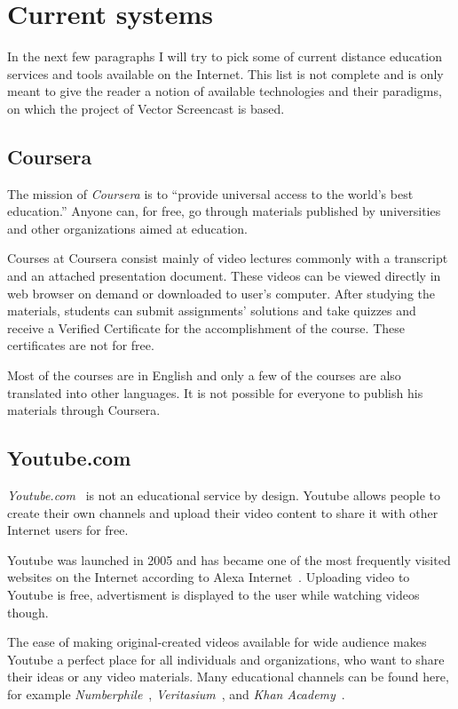 \section{Current systems}
In the next few paragraphs I will try to pick some of current distance education services and tools available on the Internet. This list is not complete and is only meant to give the reader a notion of available technologies and their paradigms, on which the project of Vector Screencast is based.

\subsection{Coursera}
The mission of \textit{Coursera} is to ``provide universal access to the world’s best education.''\cite{9} Anyone can, for free, go through materials published by universities and other organizations aimed at education.

Courses at Coursera consist mainly of video lectures commonly with a transcript and an  attached presentation document. These videos can be viewed directly in web browser on demand or downloaded to user's computer. After studying the materials, students can submit assignments' solutions and take quizzes and receive a Verified Certificate for the accomplishment of the course. These certificates are not for free.

Most of the courses are in English and only a few of the courses are also translated into other languages. It is not possible for everyone to publish his materials through Coursera.



\subsection{Youtube.com}
\textit{Youtube.com}~\cite{10} is not an educational service by design. Youtube allows people to create their own channels and upload their video content to share it with other Internet users for free.

Youtube was launched in 2005 and has became one of the most frequently visited websites on the Internet according to Alexa Internet~\cite{11}. Uploading video to Youtube is free, advertisment is displayed to the user while watching videos though.

The ease of making original-created videos available for wide audience makes Youtube a perfect place for all individuals and organizations, who want to share their ideas or any video materials. Many educational channels can be found here, for example \textit{Numberphile}~\cite{numberphile_youtube}, \textit{Veritasium}~\cite{veritasium_youtube}, and \textit{Khan Academy}~\cite{khan_academy_youtube}.

